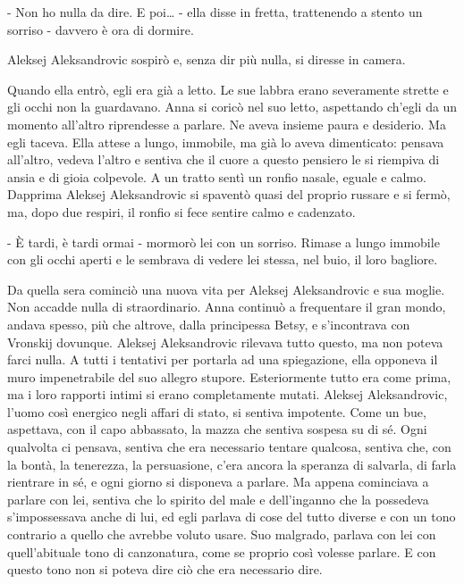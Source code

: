 - Non ho nulla da dire. E poi\ldots{} - ella disse in fretta, trattenendo a stento un sorriso - davvero è ora di dormire. 

Aleksej Aleksandrovic sospirò e, senza dir più nulla, si diresse in camera. 

Quando ella entrò, egli era già a letto. Le sue labbra erano severamente strette e gli occhi non la guardavano. Anna si coricò nel suo letto, aspettando ch'egli da un momento all'altro riprendesse a parlare. Ne aveva insieme paura e desiderio. Ma egli taceva. Ella attese a lungo, immobile, ma già lo aveva dimenticato: pensava all'altro, vedeva l'altro e sentiva che il cuore a questo pensiero le si riempiva di ansia e di gioia colpevole. A un tratto sentì un ronfio nasale, eguale e calmo. Dapprima Aleksej Aleksandrovic si spaventò quasi del proprio russare e si fermò, ma, dopo due respiri, il ronfio si fece sentire calmo e cadenzato. 

- È tardi, è tardi ormai - mormorò lei con un sorriso. Rimase a lungo immobile con gli occhi aperti e le sembrava di vedere lei stessa, nel buio, il loro bagliore. 

\label{x-1} 

Da quella sera cominciò una nuova vita per Aleksej Aleksandrovic e sua moglie. Non accadde nulla di straordinario. Anna continuò a frequentare il gran mondo, andava spesso, più che altrove, dalla principessa Betsy, e s'incontrava con Vronskij dovunque. Aleksej Aleksandrovic rilevava tutto questo, ma non poteva farci nulla. A tutti i tentativi per portarla ad una spiegazione, ella opponeva il muro impenetrabile del suo allegro stupore. Esteriormente tutto era come prima, ma i loro rapporti intimi si erano completamente mutati. Aleksej Aleksandrovic, l'uomo così energico negli affari di stato, si sentiva impotente. Come un bue, aspettava, con il capo abbassato, la mazza che sentiva sospesa su di sé. Ogni qualvolta ci pensava, sentiva che era necessario tentare qualcosa, sentiva che, con la bontà, la tenerezza, la persuasione, c'era ancora la speranza di salvarla, di farla rientrare in sé, e ogni giorno si disponeva a parlare. Ma appena cominciava a parlare con lei, sentiva che lo spirito del male e dell'inganno che la possedeva s'impossessava anche di lui, ed egli parlava di cose del tutto diverse e con un tono contrario a quello che avrebbe voluto usare. Suo malgrado, parlava con lei con quell'abituale tono di canzonatura, come se proprio così volesse parlare. E con questo tono non si poteva dire ciò che era necessario dire. 

